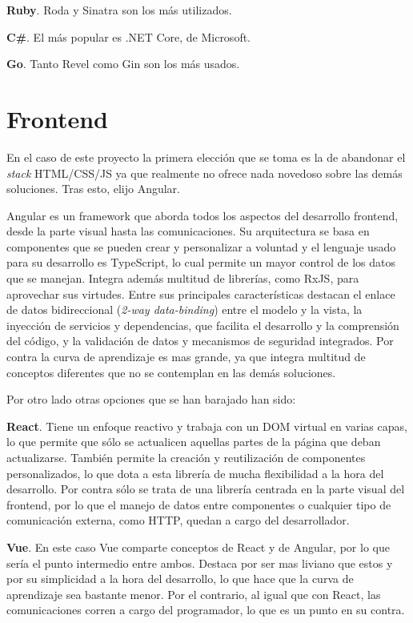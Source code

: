 \textbf{Ruby}. Roda y Sinatra son los más utilizados.

\textbf{C\#}. El más popular es .NET Core, de Microsoft.

\textbf{Go}. Tanto Revel como Gin son los más usados.



\section{Frontend}

En el caso de este proyecto la primera elección que se toma es la de abandonar el \textit{stack} HTML/CSS/JS ya que realmente no ofrece nada novedoso sobre las demás soluciones. Tras esto, elijo Angular.

Angular es un framework que aborda todos los aspectos del desarrollo frontend, desde la parte visual hasta las comunicaciones. Su arquitectura se basa en componentes que se pueden crear y personalizar a voluntad y el lenguaje usado para su desarrollo es TypeScript, lo cual permite un mayor control de los datos que se manejan. Integra además multitud de librerías, como RxJS, para aprovechar sus virtudes. Entre sus principales características destacan el enlace de datos bidireccional (\textit{2-way data-binding}) entre el modelo y la vista, la inyección de servicios y dependencias, que facilita el desarrollo y la comprensión del código, y la validación de datos y mecanismos de seguridad integrados. Por contra la curva de aprendizaje es mas grande, ya que integra multitud de conceptos diferentes que no se contemplan en las demás soluciones.

Por otro lado otras opciones que se han barajado han sido:

\textbf{React}. Tiene un enfoque reactivo y trabaja con un DOM virtual en varias capas, lo que permite que sólo se actualicen aquellas partes de la página que deban actualizarse. También permite la creación y reutilización de componentes personalizados, lo que dota a esta librería de mucha flexibilidad a la hora del desarrollo. Por contra sólo se trata de una librería centrada en la parte visual del frontend, por lo que el manejo de datos entre componentes o cualquier tipo de comunicación externa, como HTTP, quedan a cargo del desarrollador.

\textbf{Vue}. En este caso Vue comparte conceptos de React y de Angular, por lo que sería el punto intermedio entre ambos. Destaca por ser mas liviano que estos y por su simplicidad a la hora del desarrollo, lo que hace que la curva de aprendizaje sea bastante menor. Por el contrario, al igual que con React, las comunicaciones corren a cargo del programador, lo que es un punto en su contra.

